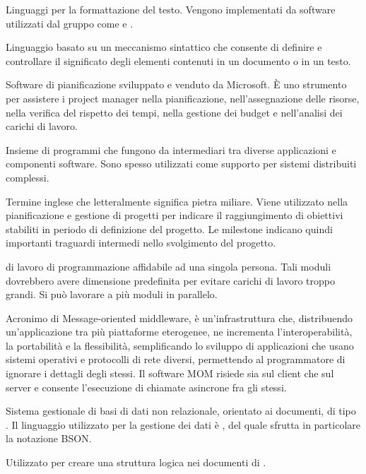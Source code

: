 Linguaggi per la formattazione del testo. Vengono implementati da software utilizzati dal gruppo come  e .

Linguaggio basato su un meccanismo sintattico che consente di definire e controllare il significato degli elementi contenuti in un documento o in un testo.

Software di pianificazione sviluppato e venduto da Microsoft. È  uno strumento per assistere i project manager nella pianificazione, nell'assegnazione delle risorse, nella verifica del rispetto dei tempi, nella gestione dei budget e nell'analisi dei carichi di lavoro.

Insieme di programmi che fungono da intermediari tra diverse applicazioni e componenti software. Sono spesso utilizzati come supporto per sistemi distribuiti complessi.

Termine inglese che letteralmente significa pietra miliare. Viene utilizzato nella pianificazione e gestione di progetti per indicare il raggiungimento di obiettivi stabiliti in periodo di definizione del progetto. 
Le milestone indicano quindi importanti traguardi intermedi nello svolgimento del progetto.

 di lavoro di programmazione affidabile ad una singola persona. Tali moduli dovrebbero avere dimensione predefinita per evitare carichi di lavoro troppo grandi. Si può lavorare a più moduli in parallelo.

Acronimo di Message-oriented middleware, è un'infrastruttura  che, distribuendo un'applicazione tra più piattaforme eterogenee, ne incrementa l'interoperabilità, la portabilità e la flessibilità, semplificando lo sviluppo di applicazioni che usano sistemi operativi e protocolli di rete diversi, permettendo al programmatore di ignorare i dettagli degli stessi.
Il software MOM risiede sia sul client che sul server e consente l'esecuzione di chiamate asincrone fra gli stessi.

Sistema gestionale di basi di dati non relazionale, orientato ai documenti, di tipo . Il linguaggio utilizzato per la gestione dei dati è , del quale sfrutta in particolare la notazione BSON.

Utilizzato per creare una struttura logica nei documenti di .

